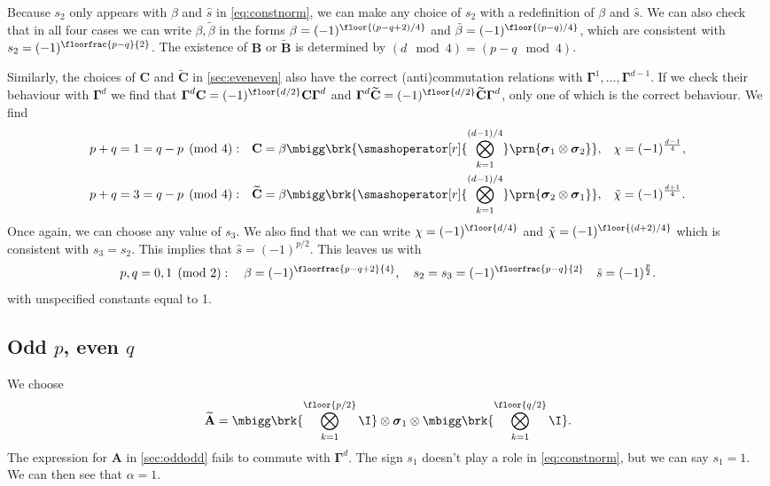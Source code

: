 \documentclass[11pt]{article}
\newcommand{\Gammab}{\boldsymbol{\Gamma}}
\newcommand{\A}{\mathbf{A}}
\newcommand{\B}{\mathbf{B}}
\renewcommand{\C}{\mathbf{C}}
\newcommand{\At}{\widetilde{\A}}
\newcommand{\Bt}{\widetilde{\B}}
\newcommand{\Ct}{\widetilde{\C}}
\newcommand{\sigmab}{\boldsymbol{\sigma}}
\newcommand{\betat}{\tilde{\beta}}
\newcommand{\chit}{\tilde{\chi}}
\begin{document}
Because $s_2$ only appears with $\beta$ and $\hat{s}$ in \cref{eq:constnorm}, we can make any choice of $s_2$ with a redefinition of $\beta$ and $\hat{s}$.
We can also check that in all four cases we can write $\beta, \betat$ in the forms $\beta = (-1)^{\floor{(p-q+2)/4}}$ and $\betat = (-1)^{\floor{(p-q)/4}}$, 
which are consistent with \(s_2 = (-1)^{\floorfrac{p-q}{2}}\).
The existence of $\B$ or $\Bt$ is determined by $(d \mod 4) = (p-q \mod 4)$.

Similarly, the choices of $\C$ and $\Ct$ in \cref{sec:eveneven} also have the correct (anti)commutation relations with $\Gammab^1, \ldots, \Gammab^{d-1}$.
If we check their behaviour with $\Gammab^d$ we find that $\Gammab^d \C = (-1)^{\floor{d/2}}\C \Gammab^d$ and $\Gammab^d \Ct = (-1)^{\floor{d/2}} \Ct \Gammab^d$, only one of which is the correct behaviour.
We find
%
\begin{equation*}
\begin{aligned}
  p+q &= 1 = q-p \pmod 4: &
  \C &= \beta \mbigg\brk{\smashoperator[r]{\bigotimes_{k=1}^{(d-1)/4}}
        \prn{\sigmab_1 \otimes \sigmab_2}}, &
  \chi &= (-1)^{\frac{d-1}{4}},
  \\
  p+q &= 3 = q-p \pmod 4: &
  \Ct &= \beta \mbigg\brk{\smashoperator[r]{\bigotimes_{k=1}^{(d-1)/4}}
        \prn{\sigmab_2 \otimes \sigmab_1}}, &
  \chit &= (-1)^{\frac{d+1}{4}}.
\end{aligned}
\end{equation*}
%
Once again, we can choose any value of $s_3$.
We also find that we can write $\chi = (-1)^{\floor{d/4}}$ and $\chit = (-1)^{\floor{(d+2)/4}}$ which is consistent with \(s_3 = s_2\).
This implies that $\hat{s} = (-1)^{p/2}$.
This leaves us with
%
\begin{equation}\label{eq:constevenodd}
  p, q = 0,1 \pmod 2 : \quad
  \beta = (-1)^{\floorfrac{p-q+2}{4}}, \quad
  s_2 = s_3 = (-1)^{\floorfrac{p-q}{2}} \quad
  \hat{s} = (-1)^{\frac{p}{2}}.
\end{equation}
%
with unspecified constants equal to 1.



\subsection{Odd \texorpdfstring{$p$}{p}, even \texorpdfstring{$q$}{q}}\label{sec:oddeven}

We choose
%
\begin{equation*}
  \At =
        \mbigg\brk{\bigotimes_{k=1}^{\floor{p/2}} \I}
        \otimes \sigmab_1
        \otimes \mbigg\brk{\bigotimes_{k=1}^{\floor{q/2}} \I}.
\end{equation*}
%
The expression for $\A$ in \cref{sec:oddodd} fails to commute with $\Gammab^d$.
The sign $s_1$ doesn't play a role in \cref{eq:constnorm}, but we can say $s_1 = 1$.
We can then see that $\alpha = 1$.
\end{document}
